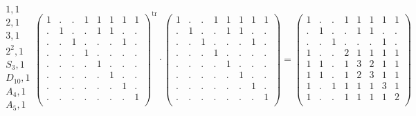 \documentclass[12pt,a4paper]{amsart}
\begin{document}
\begin{align*}
  \begin{array}{r}
    1,1 \\ \hline
    2,1 \\ \hline
    3,1 \\ \hline
    2^2,1 \\ \hline
    S_3,1 \\ \hline
    D_{10},1 \\ \hline
    A_4,1 \\ \hline
    A_5,1 \\
  \end{array}
  \left(
  \begin{array}{c|c|c|c|c|c|c|c}
    1&.&.&1&1&1&1&1\\\hline
    .&1&.&.&1&1&.&.\\\hline
    .&.&1&.&.&.&1&.\\\hline
    .&.&.&1&.&.&.&.\\\hline
    .&.&.&.&1&.&.&.\\\hline
    .&.&.&.&.&1&.&.\\\hline
    .&.&.&.&.&.&1&.\\\hline
    .&.&.&.&.&.&.&1\\
  \end{array}
\right)^{\textrm{tr}}
\cdot
  \left(
  \begin{array}{c|c|c|c|c|c|c|c}
    1&.&.&1&1&1&1&1\\\hline
    .&1&.&.&1&1&.&.\\\hline
    .&.&1&.&.&.&1&.\\\hline
    .&.&.&1&.&.&.&.\\\hline
    .&.&.&.&1&.&.&.\\\hline
    .&.&.&.&.&1&.&.\\\hline
    .&.&.&.&.&.&1&.\\\hline
    .&.&.&.&.&.&.&1\\
  \end{array}
\right)
=
  \left(
  \begin{array}{c|c|c|c|c|c|c|c}
1&.&.&1&1&1&1&1\\ \hline
.&1&.&.&1&1&.&.\\ \hline
.&.&1&.&.&.&1&.\\ \hline
1&.&.&2&1&1&1&1\\ \hline
1&1&.&1&3&2&1&1\\ \hline
1&1&.&1&2&3&1&1\\ \hline
1&.&1&1&1&1&3&1\\ \hline
1&.&.&1&1&1&1&2\\
  \end{array}
\right)
\end{align*}
\end{document}
